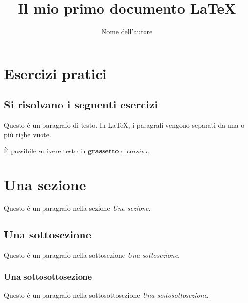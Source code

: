 \documentclass{article}
\begin{document}
    \section{Esercizi pratici}
    \subsection{Si risolvano i seguenti esercizi}


    \title{Il mio primo documento LaTeX}
    \author{Nome dell'autore}
    \date{}




    Questo è un paragrafo di testo. In LaTeX, i paragrafi vengono separati da una o più righe vuote.

    È possibile scrivere testo in \textbf{grassetto} o \emph{corsivo}.

    \section{Una sezione}

    Questo è un paragrafo nella sezione \emph{Una sezione}.

    \subsection{Una sottosezione}

    Questo è un paragrafo nella sottosezione \emph{Una sottosezione}.

    \subsubsection{Una sottosottosezione}

    Questo è un paragrafo nella sottosottosezione \emph{Una sottosottosezione}.
\end{document}
